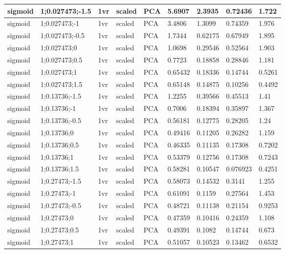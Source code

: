 \begin{longtable}{lllllllll}
sigmoid & 1;0.027473;-1.5 & 1vr & scaled & PCA & 5.6907 & 2.3935 & 0.72436 & 1.722\\ \hline
sigmoid & 1;0.027473;-1 & 1vr & scaled & PCA & 3.4806 & 1.3099 & 0.74359 & 1.976\\ \hline
sigmoid & 1;0.027473;-0.5 & 1vr & scaled & PCA & 1.7344 & 0.62175 & 0.67949 & 1.895\\ \hline
sigmoid & 1;0.027473;0 & 1vr & scaled & PCA & 1.0698 & 0.29546 & 0.52564 & 1.903\\ \hline
sigmoid & 1;0.027473;0.5 & 1vr & scaled & PCA & 0.7723 & 0.18858 & 0.28846 & 1.181\\ \hline
sigmoid & 1;0.027473;1 & 1vr & scaled & PCA & 0.65432 & 0.18336 & 0.14744 & 0.5261\\ \hline
sigmoid & 1;0.027473;1.5 & 1vr & scaled & PCA & 0.65148 & 0.14875 & 0.10256 & 0.4492\\ \hline
sigmoid & 1;0.13736;-1.5 & 1vr & scaled & PCA & 1.2255 & 0.39566 & 0.45513 & 1.41\\ \hline
sigmoid & 1;0.13736;-1 & 1vr & scaled & PCA & 0.7006 & 0.18394 & 0.35897 & 1.367\\ \hline
sigmoid & 1;0.13736;-0.5 & 1vr & scaled & PCA & 0.56181 & 0.12775 & 0.28205 & 1.24\\ \hline
sigmoid & 1;0.13736;0 & 1vr & scaled & PCA & 0.49416 & 0.11205 & 0.26282 & 1.159\\ \hline
sigmoid & 1;0.13736;0.5 & 1vr & scaled & PCA & 0.46335 & 0.11135 & 0.17308 & 0.7202\\ \hline
sigmoid & 1;0.13736;1 & 1vr & scaled & PCA & 0.53379 & 0.12756 & 0.17308 & 0.7243\\ \hline
sigmoid & 1;0.13736;1.5 & 1vr & scaled & PCA & 0.58281 & 0.10547 & 0.076923 & 0.4251\\ \hline
sigmoid & 1;0.27473;-1.5 & 1vr & scaled & PCA & 0.58073 & 0.14532 & 0.3141 & 1.255\\ \hline
sigmoid & 1;0.27473;-1 & 1vr & scaled & PCA & 0.61091 & 0.1159 & 0.27564 & 1.453\\ \hline
sigmoid & 1;0.27473;-0.5 & 1vr & scaled & PCA & 0.48721 & 0.11138 & 0.21154 & 0.9253\\ \hline
sigmoid & 1;0.27473;0 & 1vr & scaled & PCA & 0.47359 & 0.10416 & 0.24359 & 1.108\\ \hline
sigmoid & 1;0.27473;0.5 & 1vr & scaled & PCA & 0.49391 & 0.1082 & 0.14744 & 0.673\\ \hline
sigmoid & 1;0.27473;1 & 1vr & scaled & PCA & 0.51057 & 0.10523 & 0.13462 & 0.6532\\ \hline

\end{longtable}
